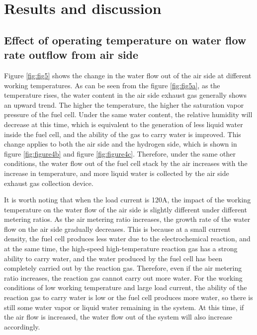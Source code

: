 \section{Results and discussion}
\subsection{Effect of operating temperature on water flow rate outflow from air side}

Figure \ref{fig:fig5} shows the change in the water flow out of the air side at different working temperatures. As can be seen from the figure \ref{fig:fig5a}, as the temperature rises, the water content in the air side exhaust gas generally shows an upward trend. The higher the temperature, the higher the saturation vapor pressure of the fuel cell. Under the same water content, the relative humidity will decrease at this time, which is equivalent to the generation of less liquid water inside the fuel cell, and the ability of the gas to carry water is improved. This change applies to both the air side and the hydrogen side, which is shown in figure \ref{fig:figure4b} and figure \ref{fig:figure4c}. Therefore, under the same other conditions, the water flow out of the fuel cell stack by the air increases with the increase in temperature, and more liquid water is collected by the air side exhaust gas collection device.
\par
It is worth noting that when the load current is 120A, the impact of the working temperature on the water flow of the air side is slightly different under different metering ratios. As the air metering ratio increases, the growth rate of the water flow on the air side gradually decreases. This is because at a small current density, the fuel cell produces less water due to the electrochemical reaction, and at the same time, the high-speed high-temperature reaction gas has a strong ability to carry water, and the water produced by the fuel cell has been completely carried out by the reaction gas. Therefore, even if the air metering ratio increases, the reaction gas cannot carry out more water. For the working conditions of low working temperature and large load current, the ability of the reaction gas to carry water is low or the fuel cell produces more water, so there is still some water vapor or liquid water remaining in the system. At this time, if the air flow is increased, the water flow out of the system will also increase accordingly.

